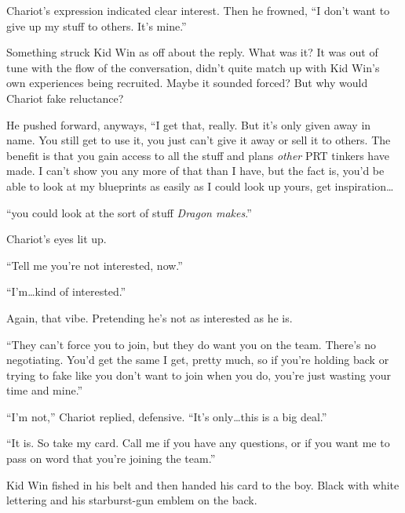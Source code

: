 Chariot's expression indicated clear interest.  Then he frowned, ``I don't want to give up my stuff to others.  It's mine.''



Something struck Kid Win as off about the reply.  What was it?   It was out of tune with the flow of the conversation, didn't quite match up with Kid Win's own experiences being recruited.  Maybe it sounded forced?  But why would Chariot fake reluctance?



He pushed forward, anyways, ``I get that, really.  But it's only given away in name.  You still get to use it, you just can't give it away or sell it to others.  The benefit is that you gain access to all the stuff and plans \emph{other} PRT tinkers have made.  I can't show you any more of that than I have, but the fact is, you'd be able to look at my blueprints as easily as I could look up yours, get inspiration\ldots



``\ldotsOr you could look at the sort of stuff \emph{Dragon makes}.''



Chariot's eyes lit up.



``Tell me you're not interested, now.''



``I'm\ldots kind of interested.''



Again, that vibe.  Pretending he's not as interested as he is.



``They can't force you to join, but they do want you on the team.  There's no negotiating.  You'd get the same I get, pretty much, so if you're holding back or trying to fake like you don't want to join when you do, you're just wasting your time and mine.''



``I'm not,'' Chariot replied, defensive.  ``It's only\ldots this is a big deal.''



``It is.  So take my card.  Call me if you have any questions, or if you want me to pass on word that you're joining the team.''



Kid Win fished in his belt and then handed his card to the boy.  Black with white lettering and his starburst-gun emblem on the back.




